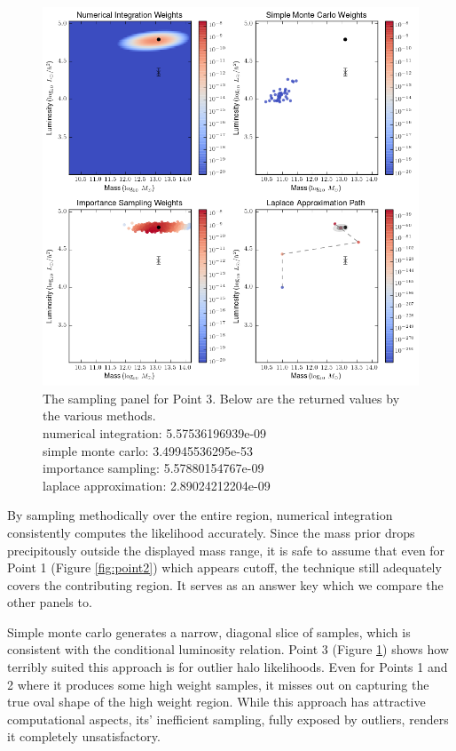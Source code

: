\documentclass[\docopts]{\docclass}
\begin{document}
\begin{figure}[!h]
\centering
\includegraphics[width=0.9\columnwidth]{point4.png}
\caption{
The sampling panel for Point 3. Below are the returned values by the various methods.\\
numerical integration: 5.57536196939e-09\\
simple monte carlo: 3.49945536295e-53\\
importance sampling: 5.57880154767e-09\\
laplace approximation: 2.89024212204e-09\\
\label{fig:point4}}
\end{figure}

By sampling methodically over the entire region, numerical integration consistently computes the likelihood accurately.
Since the mass prior drops precipitously outside the displayed mass range, it is safe to assume that even for Point 1 (Figure \ref{fig:point2}) which appears cutoff, the technique still adequately covers the contributing region.
It serves as an answer key which we compare the other panels to. 

Simple monte carlo generates a narrow, diagonal slice of samples, which is consistent with the conditional luminosity relation.
Point 3 (Figure \ref{fig:point4}) shows how terribly suited this approach is for outlier halo likelihoods.
Even for Points 1 and 2 where it produces some high weight samples, it misses out on capturing the true oval shape of the high weight region.
While this approach has attractive computational aspects, its' inefficient sampling, fully exposed by outliers, renders it completely unsatisfactory.
\end{document}

